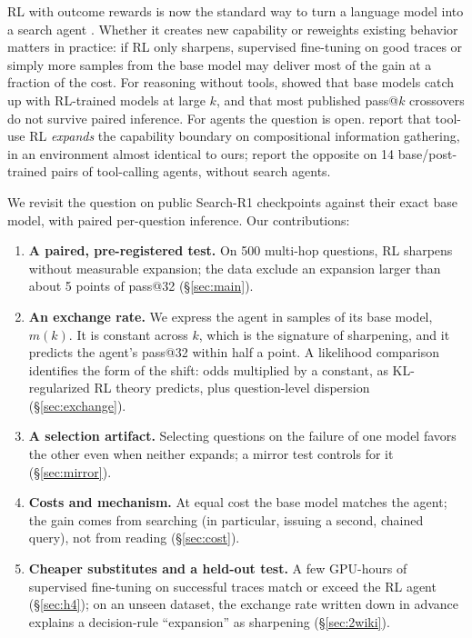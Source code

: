\documentclass[11pt]{article}
\begin{document}
RL with outcome rewards is now the standard way to turn a language model into a search agent \citep{jin2025search,song2025r1,chen2025research}. Whether it creates new capability or reweights existing behavior matters in practice: if RL only sharpens, supervised fine-tuning on good traces or simply more samples from the base model may deliver most of the gain at a fraction of the cost. For reasoning without tools, \citet{yue2025does} showed that base models catch up with RL-trained models at large $k$, and \citet{yang2026crossovers} that most published pass@$k$ crossovers do not survive paired inference. For agents the question is open. \citet{zhai2026does} report that tool-use RL \emph{expands} the capability boundary on compositional information gathering, in an environment almost identical to ours; \citet{oh2026sharpening} report the opposite on 14 base/post-trained pairs of tool-calling agents, without search agents.

We revisit the question on public Search-R1 checkpoints against their exact base model, with paired per-question inference. Our contributions:
\begin{enumerate}
\item \textbf{A paired, pre-registered test.} On 500 multi-hop questions, RL sharpens without measurable expansion; the data exclude an expansion larger than about 5 points of pass@32 (\S\ref{sec:main}).
\item \textbf{An exchange rate.} We express the agent in samples of its base model, $m(k)$. It is constant across $k$, which is the signature of sharpening, and it predicts the agent's pass@32 within half a point. A likelihood comparison identifies the form of the shift: odds multiplied by a constant, as KL-regularized RL theory predicts, plus question-level dispersion (\S\ref{sec:exchange}).
\item \textbf{A selection artifact.} Selecting questions on the failure of one model favors the other even when neither expands; a mirror test controls for it (\S\ref{sec:mirror}).
\item \textbf{Costs and mechanism.} At equal cost the base model matches the agent; the gain comes from searching (in particular, issuing a second, chained query), not from reading (\S\ref{sec:cost}).
\item \textbf{Cheaper substitutes and a held-out test.} A few GPU-hours of supervised fine-tuning on successful traces match or exceed the RL agent (\S\ref{sec:h4}); on an unseen dataset, the exchange rate written down in advance explains a decision-rule ``expansion'' as sharpening (\S\ref{sec:2wiki}).
\end{enumerate}
\end{document}
